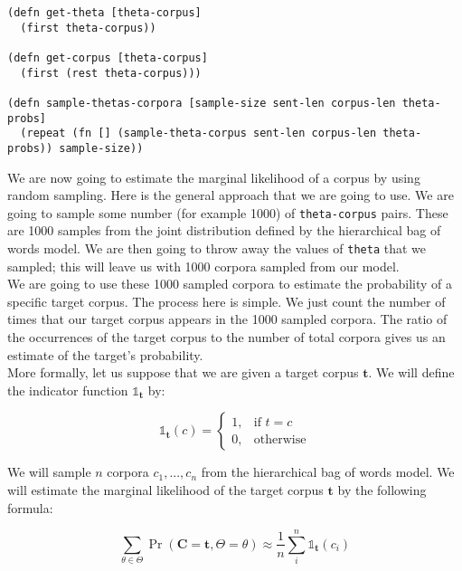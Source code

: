 \documentclass[10pt]{article}
\begin{document}
\begin{lstlisting}
(defn get-theta [theta-corpus]
  (first theta-corpus))

(defn get-corpus [theta-corpus]
  (first (rest theta-corpus)))
  
(defn sample-thetas-corpora [sample-size sent-len corpus-len theta-probs]
  (repeat (fn [] (sample-theta-corpus sent-len corpus-len theta-probs)) sample-size))
\end{lstlisting}

\noindent We are now going to estimate the marginal likelihood of a corpus by
using random sampling. Here is the general approach that we are going
to use. We are going to sample some number (for example 1000) of
\texttt{theta-corpus} pairs. These are 1000 samples from the joint
distribution defined by the hierarchical bag of words model. We are
then going to throw away the values of \texttt{theta} that we sampled;
this will leave us with 1000 corpora sampled from our model.
\\

\noindent We are going to use these 1000 sampled corpora to estimate
the probability of a specific target corpus. The process here is
simple. We just count the number of times that our target corpus
appears in the 1000 sampled corpora. The ratio of the occurrences of
the target corpus to the number of total corpora gives us an estimate
of the target's probability.
\\

\noindent More formally, let us suppose that we are given a target corpus
$\mathbf{t}$. We will define the indicator function
$\mathds{1}_{\mathbf{t}}$ by:

\begin{equation}
\mathds{1}_{\mathbf{t}}(c) = 
\begin{cases}
    1,& \text{if } t = c\\
    0,              & \text{otherwise}
\end{cases}
\end{equation}

\noindent We will sample $n$ corpora $c_1,...,c_n$ from the hierarchical bag of
words model. We will estimate the marginal likelihood of the target
corpus $\mathbf{t}$ by the following formula:

\begin{equation}
\label{eq:montecarlo-marginal}
\sum_{\theta \in \Theta} \Pr(\mathbf{C}=\mathbf{t}, \Theta=\theta)  \approx \frac{1}{n} \sum_{i}^{n}\mathds{1}_{\mathbf{t}}(c_i) 
\end{equation}
\end{document}
